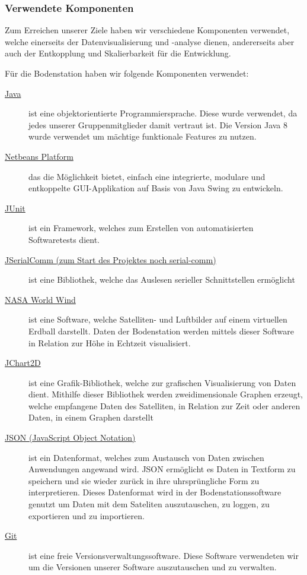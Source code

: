 \subsubsection{Verwendete Komponenten}
Zum Erreichen unserer Ziele haben wir verschiedene Komponenten verwendet, welche einerseits der Datenvisualisierung und -analyse dienen, andererseits aber auch der Entkopplung und Skalierbarkeit für die Entwicklung.

Für die Bodenstation haben wir folgende Komponenten verwendet:
\begin{description}
	\item[\href{http://www.oracle.com/technetwork/java/javase/downloads/jdk8-downloads-2133151.html}{Java}] ist eine objektorientierte Programmiersprache. Diese wurde verwendet, da jedes unserer Gruppenmitglieder damit vertraut ist. Die Version Java 8 wurde verwendet um mächtige funktionale Features zu nutzen.
	\item[\href{https://netbeans.org/features/platform/}{Netbeans Platform}] das die Möglichkeit bietet, einfach eine integrierte, modulare und entkoppelte GUI-Applikation auf Basis von Java Swing zu entwickeln.
	\item[\href{http://junit.org/}{JUnit}] ist ein Framework, welches zum Erstellen von automatisierten Softwaretests dient.
	\item[\href{http://fazecast.github.io/jSerialComm/}{JSerialComm (zum Start des Projektes noch serial-comm)}] ist eine Bibliothek, welche das Auslesen serieller Schnittstellen ermöglicht 
	\item[\href{http://worldwind.arc.nasa.gov/java/}{NASA World Wind}] ist eine Software, welche Satelliten- und Luftbilder auf einem virtuellen Erdball darstellt. Daten der Bodenstation werden mittels dieser Software in Relation zur Höhe in Echtzeit visualisiert.
	\item[\href{http://jchart2d.sourceforge.net/}{JChart2D}] ist eine Grafik-Bibliothek, welche zur grafischen Visualisierung von Daten dient. Mithilfe dieser Bibliothek werden zweidimensionale Graphen erzeugt, welche empfangene Daten des Satelliten, in Relation zur Zeit oder anderen Daten, in einem Graphen darstellt
	\item[\href{http://www.json.org/}{JSON (JavaScript Object Notation)}] ist ein Datenformat, welches zum Austausch von Daten zwischen Anwendungen angewand wird. JSON ermöglicht es Daten in Textform zu speichern und sie wieder zurück in ihre uhrsprüngliche Form zu interpretieren. Dieses Datenformat wird in der Bodenstationssoftware genutzt um Daten mit dem Sateliten auszutauschen, zu loggen, zu exportieren und zu importieren.
	\item[\href{http://git-scm.com/}{Git}] ist eine freie Versionsverwaltungssoftware. Diese Software verwendeten wir um die Versionen unserer Software auszutauschen und zu verwalten.
\end{description}